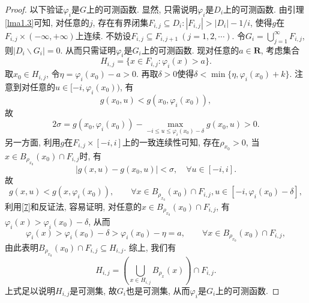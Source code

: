 \begin{proposition}
\begin{proof}
        以下验证$\varphi_i$是$G$上的可测函数. 显然, 只需说明$\varphi_i$是$D_i$上的可测函数. 由引理\ref{lma1.3}可知, 对任意的$j$, 存在有界闭集$F_{i, j} \subseteq D_i\colon |F_{i, j}| > |D_i| - 1/i$, 使得$g$在$F_{i, j} \times (-\infty, +\infty)$上连续. 不妨设$F_{i, j} \subseteq F_{i, j + 1}\ (j = 1, 2, \cdots)$.
        令$G_i = \bigcup_{j = 1}^{\infty}F_{i, j}$, 则$|D_i \smallsetminus G_i| = 0$. 从而只需证明$\varphi_i$是$G_i$上的可测函数. 现对任意的$a \in \mathbf{R}$, 考虑集合 
        \begin{equation*}
            H_{i, j} = \{x \in F_{i, j}\colon \varphi_i(x) > a\}.
        \end{equation*}
        取$x_0 \in H_{i, j}$, 令$\eta = \varphi_i(x_0) - a > 0$. 再取$\delta > 0$使得$\delta < \min\{\eta, \varphi_i(x_0) + k\}$. 注意到对任意的$u \in [-i, \varphi_i(x_0))$, 有 
        \begin{equation*}
            g(x_0, u) < g(x_0, \varphi_i(x_0)),
        \end{equation*}
        故
        \begin{equation*}
            2\sigma = g(x_0, \varphi_i(x_0)) - \max_{-i \leq u \leq \varphi_i(x_0) - \delta}g(x_0, u) > 0.
        \end{equation*}
        另一方面, 利用$g$在$F_{i, j} \times [-i, i]$上的一致连续性可知, 存在$\rho_{x_0} > 0$, 当$x \in B_{\rho_{x_0}}(x_0) \cap F_{i, j}$时, 有 
        \begin{equation*}
            |g(x, u) - g(x_0, u)| < \sigma, \quad \forall u \in [-i, i]. 
        \end{equation*}
        故 
        \begin{equation}\label{7}
            g(x, u) < g(x, \varphi_i(x_0)), \qquad \forall x \in B_{\rho_{x_0}}(x_0) \cap F_{i, j}, u \in [-i, \varphi_i(x_0) - \delta],
        \end{equation}
        利用\eqref{7}和反证法, 容易证明, 对任意的$x \in B_{\rho_{x_0}}(x_0) \cap F_{i, j}$, 有$\varphi_i(x) > \varphi_i(x_0) - \delta$, 从而
        \begin{equation*}
            \varphi_i(x) > \varphi_i(x_0) - \delta > \varphi_i(x_0) - \eta = a, \qquad \forall x \in B_{\rho_{x_0}}(x_0) \cap F_{i, j},
        \end{equation*}
        由此表明$B_{\rho_{x_0}}(x_0) \cap F_{i, j} \subseteq H_{i, j}$. 综上, 我们有
        \begin{equation*}
            H_{i, j} = \left(\bigcup_{x \in H_{i, j}}B_{\rho_x}(x)\right) \cap F_{i, j}.
        \end{equation*}
        上式足以说明$H_{i, j}$是可测集, 故$G_i$也是可测集, 从而$\varphi_i$是$G_i$上的可测函数.


\end{proof}
\end{proposition}
